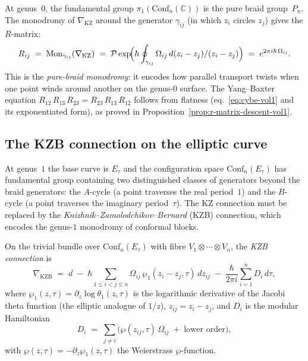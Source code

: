 At genus~$0$, the fundamental group
$\pi_1(\mathrm{Conf}_n(\mathbb{C}))$ is the pure braid group~$P_n$.
The monodromy of $\nabla_{\mathrm{KZ}}$ around the generator
$\gamma_{ij}$ (in which $z_i$ circles $z_j$) gives the $R$-matrix:
\[
R_{ij}
\;=\;
\operatorname{Mon}_{\gamma_{ij}}(\nabla_{\mathrm{KZ}})
\;=\;
\mathcal{P}\exp\!\Bigl(
\hbar
\oint_{\gamma_{ij}} \Omega_{ij}\,d(z_i - z_j)/(z_i - z_j)
\Bigr)
\;=\;
e^{2\pi i\hbar\,\Omega_{ij}}.
\]
This is the \emph{pure-braid monodromy}: it encodes how parallel
transport twists when one point winds around another on the
genus-$0$ surface.
The Yang--Baxter equation
$R_{12}\,R_{13}\,R_{23} = R_{23}\,R_{13}\,R_{12}$
follows from flatness (eq.~\eqref{eq:cybe-vol1} and its exponentiated form),
as proved in Proposition~\ref{prop:r-matrix-descent-vol1}.

\subsection{The KZB connection on the elliptic curve}
\label{sec:kzb-connection}

At genus~$1$ the base curve is $E_\tau$ and the configuration space
$\mathrm{Conf}_n(E_\tau)$ has fundamental group containing two
distinguished classes of generators beyond the braid generators: the
$A$-cycle (a point traverses the real period~$1$) and the $B$-cycle
(a point traverses the imaginary period~$\tau$). The KZ connection
must be replaced by the \emph{Knizhnik--Zamolodchikov--Bernard} (KZB)
connection, which encodes the genus-$1$ monodromy of conformal blocks.

\begin{definition}
\ClaimStatusProvedHere
\label{def:kzb-connection}
On the trivial bundle over $\mathrm{Conf}_n(E_\tau)$ with fibre
$V_1 \otimes \cdots \otimes V_n$, the \emph{KZB connection} is
\begin{equation}\label{eq:kzb}
\nabla_{\mathrm{KZB}}
\;=\;
d
\;-\;
\hbar
\sum_{1 \leq i < j \leq n}
\Omega_{ij}\,\wp_1(z_i - z_j,\tau)\,dz_{ij}
\;-\;
\frac{\hbar}{2\pi i}
\sum_{i=1}^n
D_i\,d\tau,
\end{equation}
where $\wp_1(z,\tau) = \partial_z \log\theta_1(z,\tau)$ is the
logarithmic derivative of the Jacobi theta function (the elliptic
analogue of $1/z$), $z_{ij} = z_i - z_j$, and $D_i$ is the modular
Hamiltonian
\[
D_i
\;=\;
\sum_{j \neq i}
\bigl(
\wp(z_{ij},\tau)\,\Omega_{ij}
\;+\;
\text{lower order}
\bigr),
\]
with $\wp(z,\tau) = -\partial_z \wp_1(z,\tau)$ the Weierstrass
$\wp$-function.
\end{definition}

